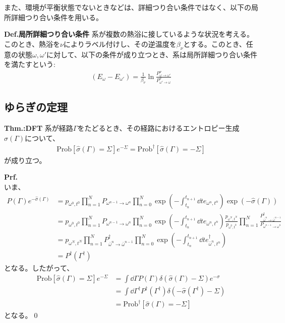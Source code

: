\documentclass[a4paper,11pt]{jsarticle}
\numberwithin{equation}{section}
\begin{document}
また、環境が平衡状態でないときなどは、詳細つり合い条件ではなく、以下の局所詳細つり合い条件を用いる。
\begin{itembox}[l]{\textbf{Def.局所詳細つり合い条件}}
  系が複数の熱浴に接しているような状況を考える。このとき、熱浴を$\nu$によりラベル付けし、その逆温度を$\beta_{\nu}$とする。このとき、任意の状態$\omega,\omega'$に対して、以下の条件が成り立つとき、系は局所詳細つり合い条件を満たすという:
  \begin{align}
    (E_{\omega} - E_{\omega'}) = \frac{1}{\beta_{\nu}}\ln \frac{P^{\nu}_{\omega \to \omega'}}{P^{\nu}_{\omega' \to \omega}}
  \end{align}
\end{itembox}


\subsection{ゆらぎの定理}

\begin{itembox}[l]{\textbf{Thm.:DFT}}
  系が経路$\Gamma$をたどるとき、その経路におけるエントロピー生成$\hat{\sigma}(\Gamma)$について、
  \begin{align}
    \text{Prob}[\hat{\sigma}(\Gamma) = \Sigma]e^{-\Sigma} = \text{Prob}^{\dagger}[\hat{\sigma}(\Gamma) = -\Sigma]
  \end{align}
  が成り立つ。
\end{itembox}
\textbf{Prf.}\\
いま、
\begin{align}
  P(\Gamma)e^{-\hat{\sigma}(\Gamma)} &=p_{\omega^0,t^0}\prod_{n=1}^{N}P_{\omega^{n-1} \to \omega^n} \prod_{n=0}^{N}\exp(-\int_{t_n}^{t_{n+1}}\dd{t}e_{\omega^n,t^n})\exp(-\hat{\sigma}(\Gamma))\\
  &=p_{\omega^0,t^0}\prod_{n=1}^{N}P_{\omega^{n-1} \to \omega^n} \prod_{n=0}^{N}\exp(-\int_{t_n}^{t_{n+1}}\dd{t}e_{\omega^n,t^n}) \frac{p_{\omega^N,t^N}}{p_{\omega^0,t^0}}\prod_{n=1}^{N}\frac{P^{\dagger}_{\bar{\omega}^n \to \bar{\omega}^{n-1}}}{P_{\omega^{n-1} \to \omega^n}}\\
  &=p_{\omega^N,t^N}\prod_{n=1}^{N}P^{\dagger}_{\bar{\omega}^{n} \to \bar{\omega}^{n-1}} \prod_{n=0}^{N}\exp(-\int_{t_n}^{t_{n+1}}\dd{t}e^{\dagger}_{\bar{\omega}^n,t^n})\\
  &=P^{\dagger}(\Gamma^{\dagger})
\end{align}
となる。したがって、
\begin{align}
  \text{Prob}[\hat{\sigma}(\Gamma) = \Sigma]e^{-\Sigma} &= \int \dd{\Gamma}P(\Gamma)\delta(\hat{\sigma}(\Gamma) - \Sigma)e^{-\sigma}\\
  &= \int \dd{\Gamma^{\dagger}}P^{\dagger}(\Gamma^{\dagger})\delta(-\hat{\sigma}(\Gamma^{\dagger}) - \Sigma)\\
  &= \text{Prob}^{\dagger}[\hat{\sigma}(\Gamma) = -\Sigma]
\end{align}
となる。\qed
\end{document}
